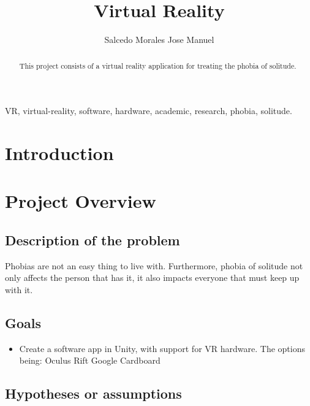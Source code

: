 \documentclass[preprint,12pt]{elsarticle}
\begin{document}
\begin{frontmatter}

\title{Virtual Reality}
\author{Salcedo Morales Jose Manuel}
\address{Tijuana, Baja California, Mexico}

\begin{abstract}
	This project consists of a virtual reality application for treating
	the phobia of solitude.
\end{abstract}

\begin{keyword}
VR, virtual-reality, software, hardware, academic, research, phobia, solitude.
\end{keyword}

\end{frontmatter}

\linenumbers

\newpage
\tableofcontents

\newpage
\section{Introduction}

\newpage
\section{Project Overview}
	\subsection{Description of the problem}
	Phobias are not an easy thing to live with. Furthermore, phobia of
	solitude not only affects the person that has it, it also impacts
	everyone that must keep up with it. \cite{Monophobia}
	\subsection{Goals}
	\begin{itemize}
		\item Create a software app in Unity, with support for VR
			hardware. The options being:
			\subitem Oculus Rift
			\subitem Google Cardboard
	\end{itemize}
	\subsection{Hypotheses or assumptions}
\end{document}
